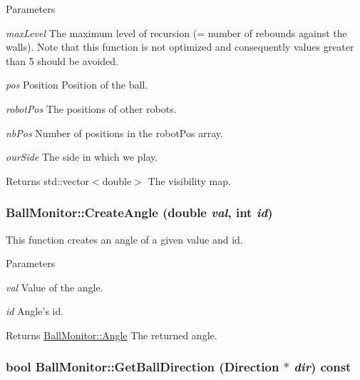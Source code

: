 \begin{DoxyParams}{Parameters}
\item[{\em maxLevel}]The maximum level of recursion (= number of rebounds against the walls). Note that this function is not optimized and consequently values greater than 5 should be avoided. \item[{\em pos}]Position Position of the ball. \item[{\em robotPos}]The positions of other robots. \item[{\em nbPos}]Number of positions in the robotPos array. \item[{\em ourSide}]The side in which we play. \end{DoxyParams}
\begin{DoxyReturn}{Returns}
std::vector$<$double$>$ The visibility map. 
\end{DoxyReturn}
\hypertarget{classBallMonitor_a805b7229e7db773c56e9987d794ada9a}{
\subsubsection[{CreateAngle}]{ BallMonitor::CreateAngle (double {\em val}, \/  int {\em id})}}
\label{classBallMonitor_a805b7229e7db773c56e9987d794ada9a}


This function creates an angle of a given value and id. 


\begin{DoxyParams}{Parameters}
\item[{\em val}]Value of the angle. \item[{\em id}]Angle's id. \end{DoxyParams}
\begin{DoxyReturn}{Returns}
\hyperlink{structBallMonitor_1_1Angle}{BallMonitor::Angle} The returned angle. 
\end{DoxyReturn}
\hypertarget{classBallMonitor_a3cd2fe1ed297c468634fbb390ca088bd}{
\subsubsection[{GetBallDirection}]{\setlength{\rightskip}{0pt plus 5cm}bool BallMonitor::GetBallDirection ({\bf Direction} $\ast$ {\em dir}) const}}
\label{classBallMonitor_a3cd2fe1ed297c468634fbb390ca088bd}



